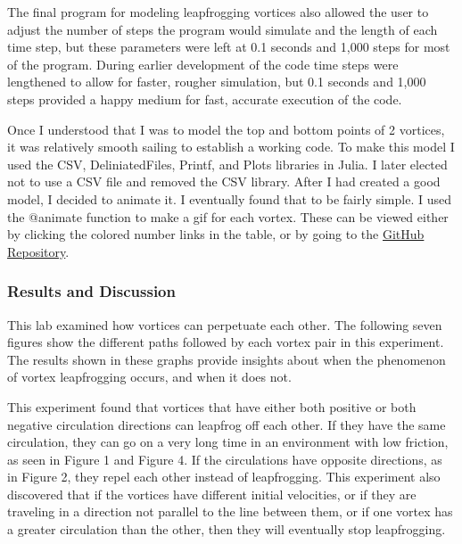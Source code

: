 \documentclass{article}
\begin{document}
The final program for modeling leapfrogging vortices also allowed the user to adjust the number of steps the program would simulate and the length of each time step, but these parameters were left at 0.1 seconds and 1,000 steps for most of the program. During earlier development of the code time steps were lengthened to allow for faster, rougher simulation, but 0.1 seconds and 1,000 steps provided a happy medium for fast, accurate execution of the code. \newline

Once I understood that I was to model the top and bottom points of 2 vortices, it was relatively smooth sailing to establish a working code. To make this model I used the CSV, DeliniatedFiles, Printf, and Plots libraries in Julia. I later elected not to use a CSV file and removed the CSV library. After I had created a good model, I decided to animate it. I eventually found that to be fairly simple. I used the \textcolor{Dandelion}{@animate} function to make a gif for each vortex. These can be viewed either by clicking the colored number links in the table, or by going to the \href{https://github.com/JoeSpencer1/LeapFrog1}{GitHub Repository}. \newline

\subsubsection*{Results and Discussion}

This lab examined how vortices can perpetuate each other. The following seven figures show the different paths followed by each vortex pair in this experiment. The results shown in these graphs provide insights about when the phenomenon of vortex leapfrogging occurs, and when it does not.\newline

This experiment found that vortices that have either both positive or both negative circulation directions can leapfrog off each other. If they have the same circulation, they can go on a very long time in an environment with low friction, as seen in Figure 1 and Figure 4. If the circulations have opposite directions, as in Figure 2, they repel each other instead of leapfrogging. This experiment also discovered that if the vortices have different initial velocities, or if they are traveling in a direction not parallel to the line between them, or if one vortex has a greater circulation than the other, then they will eventually stop leapfrogging.\newline
\end{document}
